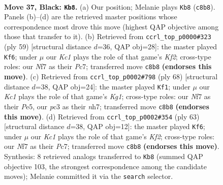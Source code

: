\documentclass[11pt]{article}
\begin{document}
\clearpage

\begin{figure}[p]\centering
\begin{subfigure}{0.46\textwidth}\centering
\resizebox{\linewidth}{!}{%
\newchessgame
\chessboard[
  setfen={2k5/p1p2npp/1p2p3/2p3P1/5q2/2P4P/1P6/1K1Q4 b - - 0 37},
  showmover=false,
  pgfstyle=straightmove, color=movearrow, markmove={c8-b8}
]}
\caption{}
\end{subfigure}\hfill
\begin{subfigure}{0.46\textwidth}\centering
\resizebox{\linewidth}{!}{%
\newchessgame
\chessboard[
  setfen={8/2p2kp1/p2p3p/2pP4/2P1q3/6PP/P4P2/2Q3K1 b - - 0 30},
  showmover=false,
  pgfstyle=straightmove, color=movearrow, markmove={f7-f6}
]}
\caption{}
\end{subfigure}
\\[4pt]
\begin{subfigure}{0.46\textwidth}\centering
\resizebox{\linewidth}{!}{%
\newchessgame
\chessboard[
  setfen={3q3k/7n/1p2Q3/p2pP3/P2P4/2P5/1P5P/6K1 w - - 1 35},
  showmover=false,
  pgfstyle=straightmove, color=movearrow, markmove={g1-f1}
]}
\caption{}
\end{subfigure}\hfill
\begin{subfigure}{0.46\textwidth}\centering
\resizebox{\linewidth}{!}{%
\newchessgame
\chessboard[
  setfen={8/p1pq1kp1/1p5p/3P4/4Q3/P5P1/1P3K1P/8 b - - 1 32},
  showmover=false,
  pgfstyle=straightmove, color=movearrow, markmove={f7-f6}
]}
\caption{}
\end{subfigure}
\caption{\textbf{Move 37, Black: \texttt{Kb8}.} (a) Our position; Melanie plays \texttt{Kb8} (\texttt{c8b8}). Panels (b)--(d) are the retrieved master positions whose correspondence most drove this move (highest QAP objective among those that transfer to it). (b) Retrieved from \texttt{ccrl\_top\_p0000\#323} (ply 59) [structural distance $d$=36, QAP obj=28]: the master played \texttt{Kf6}; under $\mu$ our \emph{Kc1} plays the role of that game's \emph{Kf2}; cross-type roles: our \emph{N}f7 as their \emph{P}c7; transferred move \texttt{c8b8} \textbf{(endorses this move)}. (c) Retrieved from \texttt{ccrl\_top\_p0002\#798} (ply 68) [structural distance $d$=38, QAP obj=24]: the master played \texttt{Kf1}; under $\mu$ our \emph{Kc1} plays the role of that game's \emph{Kg1}; cross-type roles: our \emph{N}f7 as their \emph{P}e5, our \emph{p}c3 as their \emph{n}h7; transferred move \texttt{c8b8} \textbf{(endorses this move)}. (d) Retrieved from \texttt{ccrl\_top\_p0002\#354} (ply 63) [structural distance $d$=38, QAP obj=12]: the master played \texttt{Kf6}; under $\mu$ our \emph{Kc1} plays the role of that game's \emph{Kf2}; cross-type roles: our \emph{N}f7 as their \emph{P}c7; transferred move \texttt{c8b8} \textbf{(endorses this move)}. Synthesis: 8 retrieved analogs transferred to \texttt{Kb8} (summed QAP objective 103, the strongest correspondence among the candidate moves); Melanie committed it via the \texttt{search} selector.}
\label{fig:thought-m73}
\end{figure}
\end{document}
